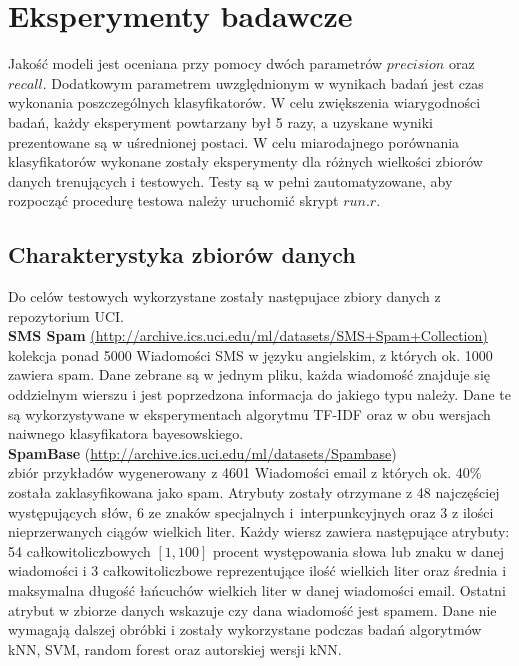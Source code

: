\documentclass[a4paper, 10pt]{article}
\begin{document}
\section{Eksperymenty badawcze}


Jakość modeli jest oceniana przy pomocy dwóch parametrów $precision$ oraz $recall$. Dodatkowym 
parametrem uwzględnionym w wynikach badań jest czas wykonania poszczególnych klasyfikatorów. 
W celu zwiększenia wiarygodności badań, każdy eksperyment powtarzany był 5 razy, a uzyskane wyniki prezentowane 
są w uśrednionej postaci. W celu miarodajnego porównania klasyfikatorów wykonane zostały eksperymenty dla różnych wielkości 
zbiorów danych trenujących i testowych. Testy są w pełni zautomatyzowane, aby rozpocząć procedurę testowa należy uruchomić skrypt 
$run.r$.






	\subsection{Charakterystyka zbiorów danych}
	
Do celów testowych wykorzystane zostały następujace zbiory danych z repozytorium UCI.\\

\textbf{SMS Spam} \url{(http://archive.ics.uci.edu/ml/datasets/SMS+Spam+Collection)} \\ kolekcja ponad 5000 Wiadomości SMS w języku angielskim, z których ok. 1000 zawiera spam. Dane zebrane są w jednym pliku, każda wiadomość znajduje się oddzielnym wierszu i 
jest poprzedzona informacja do jakiego typu należy. Dane te są wykorzystywane w eksperymentach algorytmu TF-IDF oraz w obu wersjach naiwnego klasyfikatora bayesowskiego. \\

\textbf{SpamBase} (\url{http://archive.ics.uci.edu/ml/datasets/Spambase}) \\ zbiór przykładów wygenerowany z 4601 Wiadomości email z których ok. 40\% została zaklasyfikowana jako spam. Atrybuty zostały otrzymane z 48 najczęściej występujących słów, 
6 ze znaków specjalnych i~interpunkcyjnych oraz 3 z ilości nieprzerwanych ciągów wielkich liter.  Każdy wiersz zawiera następujące atrybuty: 54 całkowitoliczbowych $[1,100]$ procent występowania słowa lub znaku w danej wiadomości 
i 3 całkowitoliczbowe reprezentujące ilość wielkich liter oraz średnia i maksymalna długość łańcuchów wielkich liter w danej wiadomości email. Ostatni atrybut w zbiorze danych wskazuje czy dana wiadomość jest spamem. 
Dane nie wymagają dalszej obróbki i zostały wykorzystane podczas badań 	algorytmów kNN, SVM, random forest oraz autorskiej wersji kNN.
	
\end{document}
